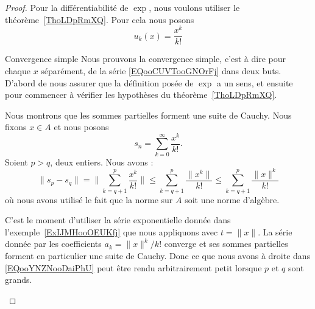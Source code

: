 \begin{proof}
    Pour la différentiabilité de \( \exp\), nous voulons utiliser le théorème~\ref{ThoLDpRmXQ}. Pour cela nous posons
    \begin{equation}
        u_k(x)=\frac{ x^k }{ k! }
    \end{equation}

    \begin{subproof}
        \item[Convergence simple]
            Nous prouvons la convergence simple, c'est à dire pour chaque \( x\) séparément, de la série \eqref{EQooCUVTooGNOrFj} dans deux buts. D'abord de nous assurer que la définition posée de \( \exp\) a un sens, et ensuite pour commencer à vérifier les hypothèses du théorème~\ref{ThoLDpRmXQ}.

            Nous montrons que les sommes partielles forment une suite de Cauchy. Nous fixons \( x\in A\) et nous posons
            \begin{equation}
                s_n=\sum_{k=0}^{\infty}\frac{ x^k }{ k! }.
            \end{equation}
            Soient \( p>q\), deux entiers. Nous avons :
            \begin{equation}        \label{EQooYNZNooDaiPhU}
                \| s_p-s_q \|=\| \sum_{k=q+1}^p\frac{ x^k }{ k! } \|\leq \sum_{k=q+1}^p\frac{ \| x^k \| }{ k! }\leq \sum_{k=q+1}^p\frac{ \| x \|^k }{ k! }
            \end{equation}
            où nous avons utilisé le fait que la norme sur \( A\) soit une norme d'algèbre.

            C'est le moment d'utiliser la série exponentielle donnée dans l'exemple~\ref{ExIJMHooOEUKfj} que nous appliquons avec \( t=\| x \|\). La série donnée par les coefficients \( a_k=\| x \|^k/k!\) converge et ses sommes partielles forment en particulier une suite de Cauchy. Donc ce que nous avons à droite dans \eqref{EQooYNZNooDaiPhU} peut être rendu arbitrairement petit lorsque \( p\) et \( q\) sont grands.


\end{subproof}
\end{proof}
